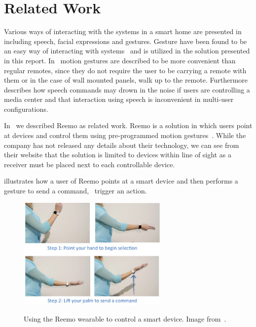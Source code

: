 \section{Related Work}
\label{sec:related-work}

Various ways of interacting with the systems in a smart home are presented in~\cite[pp. 9-10]{cook2007smart} including speech, facial expressions and gestures. Gesture have been found to be an easy way of interacting with systems~\cite[p. 6]{rahman2011motion} and is utilized in the solution presented in this report. In~\cite[pp. 2-3]{starner2000gesture} motion gestures are described to be more convenient than regular remotes, since they do not require the user to be carrying a remote with them or in the case of wall mounted panels, walk up to the remote. Furthermore~\cite{starner2000gesture} describes how speech commands may drown in the noise if users are controlling a media center and that interaction using speech is inconvenient in multi-user configurations.

In~\cite[pp. 9-11]{prespecialisation} we described Reemo as related work. Reemo is a solution in which users point at devices and control them using pre-programmed motion gestures~\cite{reemo:about}. While the company has not released any details about their technology, we can see from their website that the solution is limited to devices within line of sight as a receiver must be placed next to each controllable device.

 illustrates how a user of Reemo points at a smart device and then performs a gesture to send a command, \ie~trigger an action.

\begin{figure}[!hbt]
\centering
\includegraphics[width=0.65\textwidth]{images/reemo}
\label{fig:introduction:gesture-control:reemo}
\caption{Using the Reemo wearable to control a smart device. Image from~\cite{prespecialisation}.}
\end{figure}

